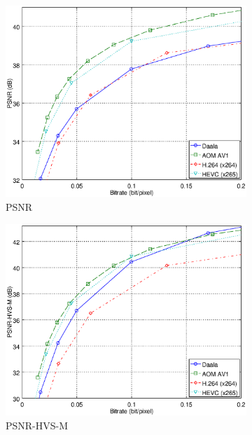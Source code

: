 \documentclass[english,conference,10pt]{IEEEtran}
\begin{document}
\begin{figure}
\centering
\begin{subfigure}[t]{0.5\textwidth}
\includegraphics[width=\columnwidth]{psnr.eps}
\caption{PSNR}
\end{subfigure}\begin{subfigure}[t]{0.5\textwidth}
\includegraphics[width=\columnwidth]{psnrhvsm.eps}
\caption{PSNR-HVS-M}\label{fig:psnrhvsm}
\end{subfigure}
\begin{subfigure}[t]{0.5\textwidth}

\end{subfigure}
\end{figure}
\end{document}
